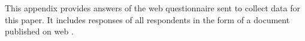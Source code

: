 
\begin{appendix}
\label{appendix_graph}
This appendix provides answers of the web questionnaire sent to collect data for this paper. It includes responses of all respondents in the form of a document published on web \cite{51}.



\newpage



\newpage



\end{appendix}

\endinput
